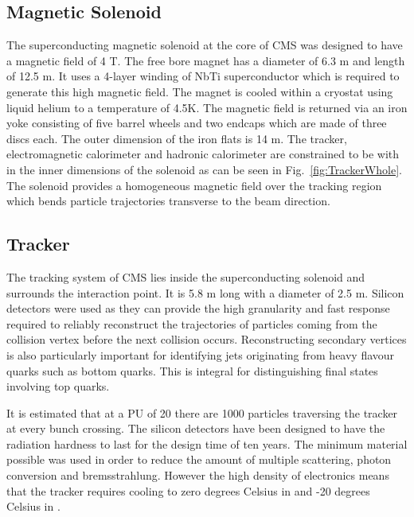\subsection{Magnetic Solenoid}

The superconducting magnetic solenoid at the core of CMS was designed to have a magnetic field of 4 T. The free bore magnet has a diameter of 6.3 m and length of 12.5 m. It uses a 4-layer winding of NbTi superconductor which is required to generate this high magnetic field. The magnet is cooled within a cryostat using liquid helium to a temperature of 4.5K. The magnetic field is returned via an iron yoke consisting of five barrel wheels and two endcaps which are made of three discs each. The outer dimension of the iron flats is 14 m. The tracker, electromagnetic calorimeter and hadronic calorimeter are constrained to be with in the inner dimensions of the solenoid as can be seen in Fig.~\ref{fig:TrackerWhole}. The solenoid provides a homogeneous magnetic field over the tracking region which bends particle trajectories transverse to the beam direction.

\subsection{Tracker \label{sec:tracker}}

The tracking system of CMS lies inside the superconducting solenoid and surrounds the interaction point. It is 5.8 m long with a diameter of 2.5 m.
Silicon detectors were used as they can provide the high granularity and fast response required to reliably reconstruct the trajectories of particles coming from the collision vertex before the next collision occurs.
Reconstructing secondary vertices is also particularly important for identifying jets originating from heavy flavour quarks such as bottom quarks. This is integral for distinguishing final states involving top quarks.

It is estimated that at a PU of 20 there are 1000 particles traversing the tracker at every bunch crossing. The silicon detectors have been designed to have the radiation hardness to last for the design time of ten years. The minimum material possible was used in order to reduce the amount of multiple scattering, photon conversion and bremsstrahlung. However the high density of electronics means that the tracker requires cooling to zero degrees Celsius in \runone and -20 degrees Celsius in \runtwo. %

